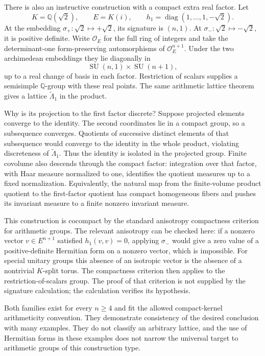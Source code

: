 \documentclass[11pt]{article}
\begin{document}
There is also an instructive construction with a compact extra real factor. Let
\[
 K=\mathbb Q(\sqrt2),\qquad E=K(i),\qquad
 h_1=\operatorname{diag}(1,\ldots,1,-\sqrt2).
 \tag{351.4}
\]
At the embedding $\sigma_+:\sqrt2\mapsto+\sqrt2$, its signature is $(n,1)$. At $\sigma_-:\sqrt2\mapsto-\sqrt2$, it is positive definite. Write $\mathcal O_E$ for the full ring of integers and take the determinant-one form-preserving automorphisms of $\mathcal O_E^{n+1}$. Under the two archimedean embeddings they lie diagonally in
\[
 \operatorname{SU}(n,1)\times\operatorname{SU}(n+1),
 \tag{351.5}
\]
up to a real change of basis in each factor. Restriction of scalars supplies a semisimple $\mathbb Q$-group with these real points. The same arithmetic lattice theorem gives a lattice $\widetilde\Lambda_1$ in the product.

Why is its projection to the first factor discrete? Suppose projected elements converge to the identity. The second coordinates lie in a compact group, so a subsequence converges. Quotients of successive distinct elements of that subsequence would converge to the identity in the whole product, violating discreteness of $\widetilde\Lambda_1$. Thus the identity is isolated in the projected group. Finite covolume also descends through the compact factor: integration over that factor, with Haar measure normalized to one, identifies the quotient measures up to a fixed normalization. Equivalently, the natural map from the finite-volume product quotient to the first-factor quotient has compact homogeneous fibers and pushes its invariant measure to a finite nonzero invariant measure.

This construction is cocompact by the standard anisotropy compactness criterion for arithmetic groups. The relevant anisotropy can be checked here: if a nonzero vector $v\in E^{n+1}$ satisfied $h_1(v,v)=0$, applying $\sigma_-$ would give a zero value of a positive-definite Hermitian form on a nonzero vector, which is impossible. For special unitary groups this absence of an isotropic vector is the absence of a nontrivial $K$-split torus. The compactness criterion then applies to the restriction-of-scalars group. The proof of that criterion is not supplied by the signature calculation; the calculation verifies its hypothesis.

Both families exist for every $n\ge4$ and fit the allowed compact-kernel arithmeticity convention. They demonstrate consistency of the desired conclusion with many examples. They do not classify an arbitrary lattice, and the use of Hermitian forms in these examples does not narrow the universal target to arithmetic groups of this construction type.
\end{document}
